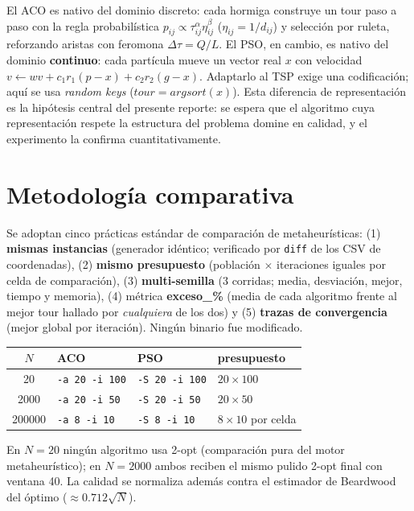 \documentclass[11pt,a4paper]{article}
\begin{document}
El ACO es nativo del dominio discreto: cada hormiga construye un tour paso a paso con la regla probabilística $p_{ij} \propto \tau_{ij}^{\alpha}\eta_{ij}^{\beta}$ ($\eta_{ij}=1/d_{ij}$) y selección por ruleta, reforzando aristas con feromona $\Delta\tau = Q/L$. El PSO, en cambio, es nativo del dominio \textbf{continuo}: cada partícula mueve un vector real $x$ con velocidad $v \leftarrow wv + c_1r_1(p-x) + c_2r_2(g-x)$. Adaptarlo al TSP exige una codificación; aquí se usa \textit{random keys} ($tour = argsort(x)$). Esta diferencia de representación es la hipótesis central del presente reporte: se espera que el algoritmo cuya representación respete la estructura del problema domine en calidad, y el experimento la confirma cuantitativamente.

\section{Metodología comparativa}
Se adoptan cinco prácticas estándar de comparación de metaheurísticas: (1) \textbf{mismas instancias} (generador idéntico; verificado por \texttt{diff} de los CSV de coordenadas), (2) \textbf{mismo presupuesto} (población $\times$ iteraciones iguales por celda de comparación), (3) \textbf{multi-semilla} (3 corridas; media, desviación, mejor, tiempo y memoria), (4) métrica \textbf{exceso\_\%} (media de cada algoritmo frente al mejor tour hallado por \textit{cualquiera} de los dos) y (5) \textbf{trazas de convergencia} (mejor global por iteración). Ningún binario fue modificado.

\begin{center}
\begin{tabular}{@{}clll@{}}
\toprule $N$ & ACO & PSO & presupuesto \\
\midrule 20 & \texttt{-a 20 -i 100} & \texttt{-S 20 -i 100} & $20\times100$ \\
2000 & \texttt{-a 20 -i 50} & \texttt{-S 20 -i 50} & $20\times50$ \\
200000 & \texttt{-a 8 -i 10} & \texttt{-S 8 -i 10} & $8\times10$ por celda \\
\bottomrule
\end{tabular}
\end{center}
En $N=20$ ningún algoritmo usa 2-opt (comparación pura del motor metaheurístico); en $N=2000$ ambos reciben el mismo pulido 2-opt final con ventana 40. La calidad se normaliza además contra el estimador de Beardwood del óptimo ($\approx 0{.}712\sqrt{N}$).
\end{document}
